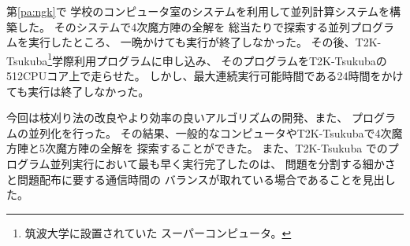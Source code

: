 \def \wrkdir {p.jsec/}

\label{pa:jsec}

第\ref{pa:ngk}\postmpartname{}で
学校のコンピュータ室のシステムを利用して並列計算システムを構築した。
そのシステムで4次魔方陣の全解を
総当たりで探索する並列プログラムを実行したところ、
一晩かけても実行が終了しなかった。
その後、T2K-Tsukuba\footnote{筑波大学に設置されていた
スーパーコンピュータ。}学際利用プログラムに申し込み、
そのプログラムをT2K-Tsukubaの512CPUコア上で走らせた。
しかし、最大連続実行可能時間である24時間をかけても実行は終了しなかった。

今回は枝刈り法の改良やより効率の良いアルゴリズムの開発、また、
プログラムの並列化を行った。
その結果、一般的なコンピュータやT2K-Tsukubaで4次魔方陣と5次魔方陣の全解を
探索することができた。
また、T2K-Tsukuba でのプログラム並列実行において最も早く実行完了したのは、
問題を分割する細かさと問題配布に要する通信時間の
バランスが取れている場合であることを見出した。

